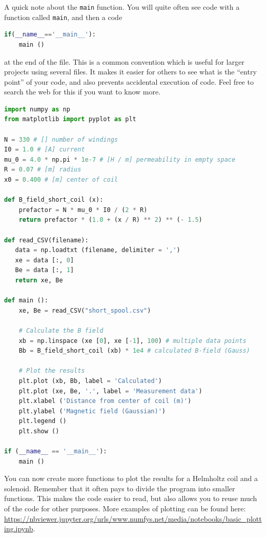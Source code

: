 \documentclass[../Elmag-labhefte-2020.tex]{subfiles}
\begin{document}
\begin{marginlisting}
A quick note about the \texttt{main} function.
You will quite often see code with a function called \texttt{main}, and then a code
\begin{lstlisting}[language=python,style=kaolstplain,breaklines=false]
if(__name__=='__main__'):
    main ()
\end{lstlisting}
at the end of the file.
This is a common convention which is useful for larger projects using several files.
It makes it easier for others to see what is the ``entry point'' of your code, and also prevents accidental execution of code.
Feel free to search the web for this if you want to know more.
\end{marginlisting}
\begin{lstlisting}[language=python]
import numpy as np
from matplotlib import pyplot as plt

N = 330 # [] number of windings
I0 = 1.0 # [A] current
mu_0 = 4.0 * np.pi * 1e-7 # [H / m] permeability in empty space
R = 0.07 # [m] radius
x0 = 0.400 # [m] center of coil

def B_field_short_coil (x):
    prefactor = N * mu_0 * I0 / (2 * R)
    return prefactor * (1.0 + (x / R) ** 2) ** (- 1.5)

def read_CSV(filename):
   data = np.loadtxt (filename, delimiter = ',')
   xe = data [:, 0]
   Be = data [:, 1]
   return xe, Be
    
def main ():
    xe, Be = read_CSV("short_spool.csv")
    
    # Calculate the B field
    xb = np.linspace (xe [0], xe [-1], 100) # multiple data points
    Bb = B_field_short_coil (xb) * 1e4 # calculated B-field (Gauss)
    
    # Plot the results
    plt.plot (xb, Bb, label = 'Calculated')
    plt.plot (xe, Be, '.', label = 'Measurement data')
    plt.xlabel ('Distance from center of coil (m)')
    plt.ylabel ('Magnetic field (Gaussian)')
    plt.legend ()
    plt.show ()
    
if (__name__ == '__main__'):
    main ()
\end{lstlisting}

You can now create more functions to plot the results for a Helmholtz coil and a solenoid. Remember that it often pays to divide the program into smaller functions. This makes the code easier to read, but also allows you to reuse much of the code for other purposes. More examples of plotting can be found here: \url{https://nbviewer.jupyter.org/urls/www.numfys.net/media/notebooks/basic_plotting.ipynb}.
\end{document}
